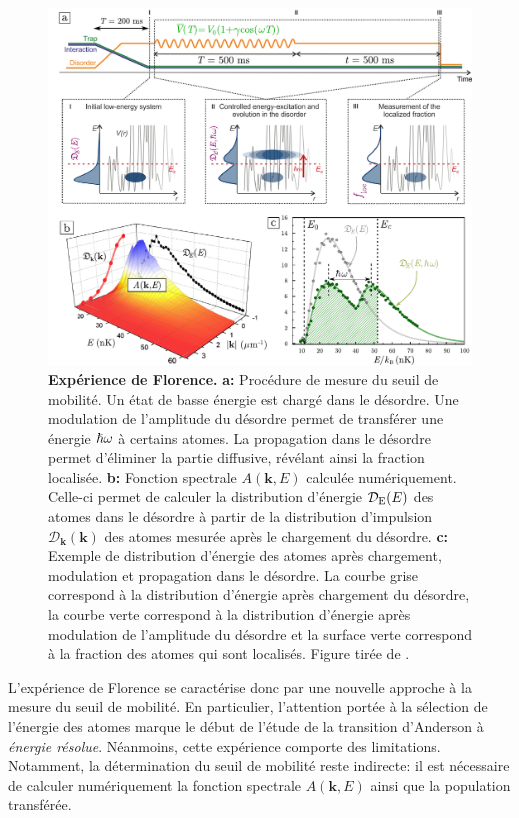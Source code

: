 \begin{figure}
\centering
\includegraphics[width=\textwidth]{Fig/Localisation/experience_florence.pdf}
\caption{\textbf{Expérience de Florence.} \textbf{a:} Procédure de mesure du seuil de mobilité. Un état de basse énergie est chargé dans le désordre. Une modulation de l'amplitude du désordre permet de transférer une énergie $\hslash \omega$ à certains atomes. La propagation dans le désordre permet d'éliminer la partie diffusive, révélant ainsi la fraction localisée. \textbf{b:} Fonction spectrale $A(\mathbf{k},E)$ calculée numériquement. Celle-ci permet de calculer la distribution d'énergie $\mathcal{D}_{\mathrm{E}}(E)$ des atomes dans le désordre à partir de la distribution d'impulsion $\mathcal{D}_{\mathbf{k}}(\mathbf{k})$ des atomes mesurée après le chargement du désordre. \textbf{c:} Exemple de distribution d'énergie des atomes après chargement, modulation et propagation dans le désordre. La courbe grise correspond à la distribution d'énergie après chargement du désordre, la courbe verte correspond à la distribution d'énergie après modulation de l'amplitude du désordre et la surface verte correspond à la fraction des atomes qui sont localisés. Figure tirée de \citep{denechaud2018vers}.}
\label{fig:experience_florence}
\end{figure}

L'expérience de Florence se caractérise donc par une nouvelle approche à la mesure du seuil de mobilité. En particulier, l'attention portée à la sélection de l'énergie des atomes marque le début de l'étude de la transition d'Anderson à \emph{énergie résolue}. Néanmoins, cette expérience comporte des limitations. Notamment, la détermination du seuil de mobilité reste indirecte: il est nécessaire de calculer numériquement la fonction spectrale $A(\mathbf{k},E)$ ainsi que la population transférée. 



